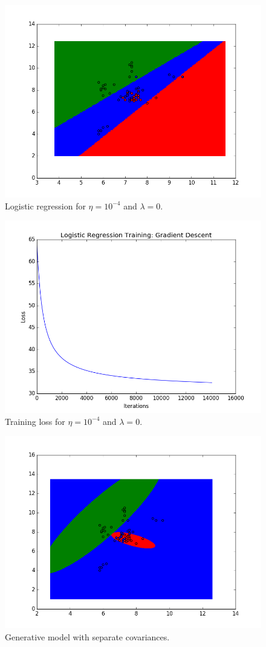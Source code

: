 \documentclass[submit]{harvardml}
\begin{document}
\begin{solution}
\begin{sol}
\begin{figure}[h!]
  \includegraphics[width=4.5in]{logistic_regression_result.png}
  \caption{Logistic regression for $\eta = 10^{-4}$ and $\lambda = 0$.}
\end{figure}

\begin{figure}[h!]
  \includegraphics[width=4.5in]{logistic_regression_loss.png}
  \caption{Training loss for $\eta = 10^{-4}$ and $\lambda = 0$.}
\end{figure}

\begin{figure}[h!]
  \includegraphics[width=4.5in]{generative_result_separate_covariances.png}
  \caption{Generative model with separate covariances.}
\end{figure}


\end{sol}
\end{solution}
\end{document}
